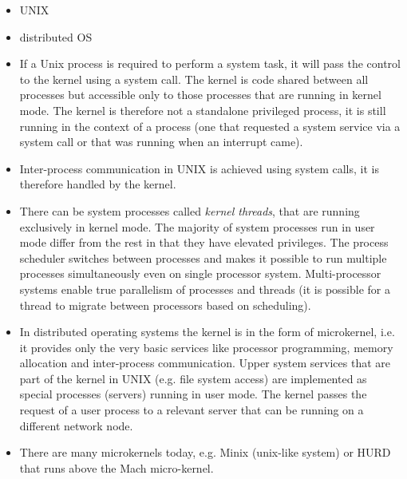 
\begin{slide}
\begin{itemize}
\item UNIX\vspace{1ex}


\item distributed OS\vspace{1ex}


\end{itemize}
\end{slide}

\begin{itemize}
\item If a Unix process is required to perform a system task, it will pass the
control to the kernel using a system call. The kernel is code shared between
all processes but accessible only to those processes that are running in
kernel mode. The kernel is therefore not a standalone privileged process,
it is still running in the context of a process (one that requested a system
service via a system call or that was running when an interrupt came).
\item Inter-process communication in UNIX is achieved using system calls,
it is therefore handled by the kernel.
\item There can be system processes called \emph{kernel threads}, that are
running exclusively in kernel mode. The majority of system processes run in user
mode differ from the rest in that they have elevated privileges.
The process scheduler switches between processes and makes it possible to run
multiple processes simultaneously even on single processor system.
Multi-processor systems enable true parallelism of processes and threads
(it is possible for a thread to migrate between processors based on scheduling).
\item In distributed operating systems the kernel is in the form of microkernel,
i.e. it provides only the very basic services like processor programming, memory
allocation and inter-process communication. Upper system services that are part
of the kernel in UNIX (e.g. file system access) are implemented as special processes
(servers) running in user mode. The kernel passes the request of a user process to a
relevant server that can be running on a different network node.
\item There are many microkernels today, e.g. Minix (unix-like system) or HURD
that runs above the Mach micro-kernel.
\end{itemize}

